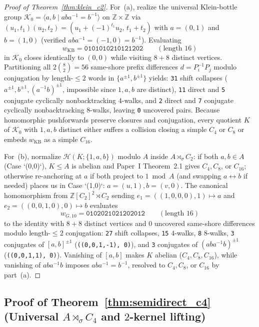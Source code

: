 \documentclass[11pt]{amsart}
\theoremstyle{definition}
\theoremstyle{remark}
\newcommand{\Z}{\mathbb{Z}}
\newcommand{\Haar}{\mathcal{H}}
\begin{document}
\begin{proof}[Proof of Theorem~\ref{thm:klein_c2}]
For~(a), realize the universal Klein-bottle group $\mathcal{K}_0 = \langle a, b \mid a b a^{-1} = b^{-1} \rangle$ on $\Z \times \Z$ via $(u_1, t_1)(u_2, t_2) = (u_1 + (-1)^{t_1} u_2,\, t_1 + t_2)$ with $a = (0,1)$ and $b = (1,0)$ (verified $a b a^{-1} = (-1,0) = b^{-1}$). Evaluating
\[
w_{\mathrm{KB}} = \mathtt{0101010210121202} \qquad (\text{length } 16)
\]
in $\mathcal{K}_0$ closes identically to $(0,0)$ while visiting $8 + 8$ distinct vertices. Partitioning all $2\binom{8}{2} = 56$ same-shore prefix differences $d = P_i^{-1} P_j$ modulo conjugation by length-$\le 2$ words in $\{a^{\pm 1}, b^{\pm 1}\}$ yields: \texttt{31} shift collapses ($a^{\pm 1}, b^{\pm 1}, (a^{-1}b)^{\pm 1}$, impossible since $1, a, b$ are distinct), \texttt{11} direct and \texttt{5} conjugate cyclically nonbacktracking $4$-walks, and \texttt{2} direct and \texttt{7} conjugate cyclically nonbacktracking $8$-walks, leaving \texttt{0} uncovered pairs. Because homomorphic pushforwards preserve closures and conjugation, every quotient $K$ of $\mathcal{K}_0$ with $1, a, b$ distinct either suffers a collision closing a simple $C_4$ or $C_8$ or embeds $w_{\mathrm{KB}}$ as a simple $C_{16}$.

For~(b), normalize $\Haar(K; \{1,a,b\})$ modulo $A$ inside $A \rtimes_\sigma C_2$: if both $a, b \in A$ (Case `(0,0)`), $K \le A$ is abelian and Paper~I Theorem~2.1 gives $C_4, C_8$, or $C_{16}$; otherwise re-anchoring at $a$ if both project to $1 \bmod A$ (and swapping $a \leftrightarrow b$ if needed) places us in Case `(1,0)`: $a = (u, 1), b = (v, 0)$. The canonical homomorphism from $\Z[C_2]^2 \rtimes C_2$ sending $e_1 = ((1,0,0,0), 1) \mapsto a$ and $e_2 = ((0,0,1,0), 0) \mapsto b$ evaluates
\[
w_{G,10} = \mathtt{0102021021202012} \qquad (\text{length } 16)
\]
to the identity with $8 + 8$ distinct vertices and $0$ uncovered same-shore differences modulo length-$\le 2$ conjugation: \texttt{27} shift collapses, \texttt{15} $4$-walks, \texttt{8} $8$-walks, \texttt{3} conjugates of $[a,b]^{\pm 1}$ (\texttt{((0,0,1,-1), 0)}), and \texttt{3} conjugates of $(a b a^{-1} b)^{\pm 1}$ (\texttt{((0,0,1,1), 0)}). Vanishing of $[a,b]$ makes $K$ abelian ($C_4, C_8, C_{16}$), while vanishing of $a b a^{-1} b$ imposes $a b a^{-1} = b^{-1}$, resolved to $C_4, C_8$, or $C_{16}$ by part~(a).
\end{proof}

\subsection{Proof of Theorem~\ref{thm:semidirect_c4} (Universal $A \rtimes_\sigma C_4$ and $2$-kernel lifting)}
\end{document}
